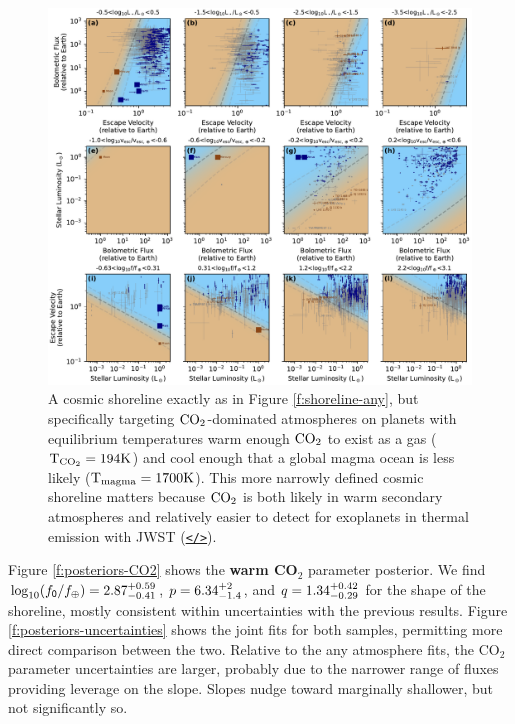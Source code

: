 \documentclass[modern,linenumbers,trackchanges]{aastex7}
\begin{document}
\begin{figure}[ht!]
\includegraphics[width=\textwidth]{figures/grid-of-shorelines-CO2.pdf}
\caption{A cosmic shoreline exactly as in Figure \ref{f:shoreline-any}, but specifically targeting $\rm{CO}_2$-dominated atmospheres on planets with equilibrium temperatures warm enough $\rm{CO_2}$ to exist as a gas (${\rm T_{CO_2}}= 194 \mathrm{K}$) and cool enough that a global magma ocean is less likely (${\rm T_{magma}} = 1700 \mathrm{K}$). This more narrowly defined cosmic shoreline matters because $\rm CO_2$ is both likely in warm secondary atmospheres and relatively easier to detect for exoplanets in thermal emission with JWST (\href{https://github.com/zkbt/shoreline/blob/main/notebooks/plot-shorelines.ipynb}{\texttt{</>}}).}
\label{f:shoreline-CO2}
\end{figure}

Figure \ref{f:posteriors-CO2} shows the {\bf warm CO$_2$} parameter posterior. We find $\log_{10} (f_{\sf 0}/f_\oplus) = 2.87_{-0.41}^{+0.59}$, $p = 6.34_{-1.4}^{+2}$, and $q = 1.34_{-0.29}^{+0.42}$ for the shape of the shoreline, mostly consistent within uncertainties with the previous results. Figure \ref{f:posteriors-uncertainties} shows the joint fits for both samples, permitting more direct comparison between the two. Relative to the any atmosphere fits, the CO$_2$ parameter uncertainties are larger, probably due to the narrower range of fluxes providing leverage on the slope. Slopes nudge toward marginally shallower, but not significantly so. 
\end{document}
